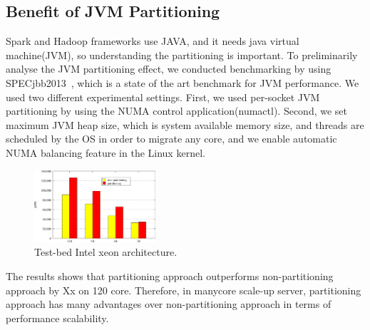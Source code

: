 \fi



\subsection{Benefit of JVM Partitioning}


Spark and Hadoop frameworks use JAVA, and it needs java virtual machine(JVM), so
understanding the partitioning is important.
To preliminarily analyse the JVM partitioning effect, we conducted
benchmarking by using SPECjbb2013~\cite{Pogue2014SO}, which is a state of the art
benchmark for JVM performance.
We used two different experimental settings. 
First, we used per-socket JVM partitioning by using the NUMA control application(numactl).
Second, we set maximum JVM heap size, which is system
available memory size, and threads are scheduled by the OS
in order to migrate any core, and we enable automatic NUMA balancing feature
in the Linux kernel.

\begin{figure}[h]
  \begin{center}
     \includegraphics[width=0.4\textwidth]{graph/SPECjbb2013}
  \end{center}
  \caption{Test-bed Intel xeon architecture.}
  \label{fig:basic}
\end{figure}

The results shows that partitioning approach outperforms non-partitioning approach by Xx on 120 core.
Therefore, in manycore scale-up server, partitioning approach has many
advantages over non-partitioning approach in terms of performance scalability.